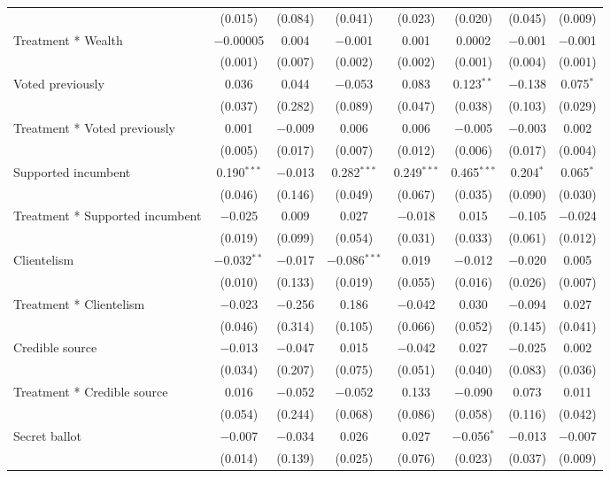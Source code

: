 \begin{table}[H]
{\begin{tabular}{@{\extracolsep{1pt}}lccccccc}
  & (0.015) & (0.084) & (0.041) & (0.023) & (0.020) & (0.045) & (0.009) \\ 
  Treatment * Wealth & $-$0.00005 & 0.004 & $-$0.001 & 0.001 & 0.0002 & $-$0.001 & $-$0.001 \\ 
  & (0.001) & (0.007) & (0.002) & (0.002) & (0.001) & (0.004) & (0.001) \\ 
  Voted previously & 0.036 & 0.044 & $-$0.053 & 0.083 & 0.123$^{**}$ & $-$0.138 & 0.075$^{*}$ \\ 
  & (0.037) & (0.282) & (0.089) & (0.047) & (0.038) & (0.103) & (0.029) \\ 
  Treatment * Voted previously & 0.001 & $-$0.009 & 0.006 & 0.006 & $-$0.005 & $-$0.003 & 0.002 \\ 
  & (0.005) & (0.017) & (0.007) & (0.012) & (0.006) & (0.017) & (0.004) \\ 
  Supported incumbent & 0.190$^{***}$ & $-$0.013 & 0.282$^{***}$ & 0.249$^{***}$ & 0.465$^{***}$ & 0.204$^{*}$ & 0.065$^{*}$ \\ 
  & (0.046) & (0.146) & (0.049) & (0.067) & (0.035) & (0.090) & (0.030) \\ 
  Treatment * Supported incumbent & $-$0.025 & 0.009 & 0.027 & $-$0.018 & 0.015 & $-$0.105 & $-$0.024 \\ 
  & (0.019) & (0.099) & (0.054) & (0.031) & (0.033) & (0.061) & (0.012) \\ 
  Clientelism & $-$0.032$^{**}$ & $-$0.017 & $-$0.086$^{***}$ & 0.019 & $-$0.012 & $-$0.020 & 0.005 \\ 
  & (0.010) & (0.133) & (0.019) & (0.055) & (0.016) & (0.026) & (0.007) \\ 
  Treatment * Clientelism & $-$0.023 & $-$0.256 & 0.186 & $-$0.042 & 0.030 & $-$0.094 & 0.027 \\ 
  & (0.046) & (0.314) & (0.105) & (0.066) & (0.052) & (0.145) & (0.041) \\ 
  Credible source & $-$0.013 & $-$0.047 & 0.015 & $-$0.042 & 0.027 & $-$0.025 & 0.002 \\ 
  & (0.034) & (0.207) & (0.075) & (0.051) & (0.040) & (0.083) & (0.036) \\ 
  Treatment * Credible source & 0.016 & $-$0.052 & $-$0.052 & 0.133 & $-$0.090 & 0.073 & 0.011 \\ 
  & (0.054) & (0.244) & (0.068) & (0.086) & (0.058) & (0.116) & (0.042) \\ 
  Secret ballot & $-$0.007 & $-$0.034 & 0.026 & 0.027 & $-$0.056$^{*}$ & $-$0.013 & $-$0.007 \\ 
  & (0.014) & (0.139) & (0.025) & (0.076) & (0.023) & (0.037) & (0.009) \\ 

\end{tabular}}
\end{table}
